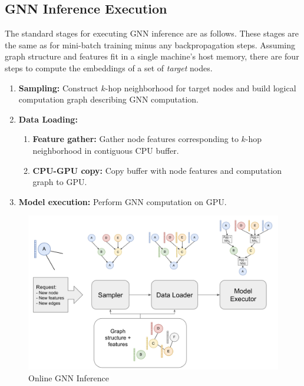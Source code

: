 \subsection{GNN Inference Execution} 
The standard stages for executing GNN inference are as follows. These stages are the same as for mini-batch training minus any backpropagation steps. Assuming graph structure and features fit in a single machine's host memory, there are four steps to compute the embeddings of a set of \textit{target} nodes.

\begin{enumerate}
    \item \textbf{Sampling:} Construct $k$-hop neighborhood for target nodes and build logical computation graph describing GNN computation.
    \item \textbf{Data Loading:}
    \begin{enumerate}
        \item \textbf{Feature gather:} Gather node features corresponding to $k$-hop neighborhood in contiguous CPU buffer.
        \item \textbf{CPU-GPU copy:} Copy buffer with node features and computation graph to GPU.
    \end{enumerate}
    \item \textbf{Model execution:} Perform GNN computation on GPU.
\end{enumerate}

\begin{figure}[h!!!]
    \centering
    \includegraphics[width=\textwidth]{figures/Compute example.png}
    
    \caption{Online GNN Inference}
    \label{Compute Visualization}
\end{figure}    

